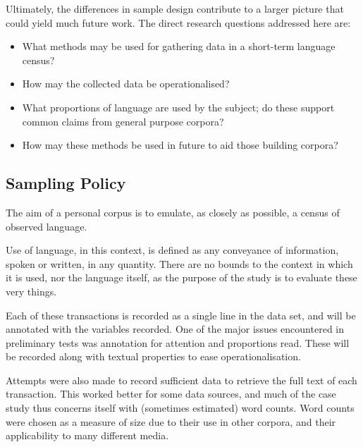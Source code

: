 Ultimately, the differences in sample design contribute to a larger picture that could yield much future work.  The direct research questions addressed here are:

\begin{itemize}
    \item What methods may be used for gathering data in a short-term language census?
    \item How may the collected data be operationalised?
    \item What proportions of language are used by the subject; do these support common claims from general purpose corpora?
    \item How may these methods be used in future to aid those building corpora?
\end{itemize}







\subsection{Sampling Policy}
\label{sec:personal:samplingpolicy}
The aim of a personal corpus is to emulate, as closely as possible, a census of observed language.

Use of language, in this context, is defined as any conveyance of information, spoken or written, in any quantity. There are no bounds to the context in which it is used, nor the language itself, as the purpose of the study is to evaluate these very things.

Each of these transactions is recorded as a single line in the data set, and will be annotated with the variables recorded.  One of the major issues encountered in preliminary tests was annotation for attention and proportions read.  These will be recorded along with textual properties to ease operationalisation.

Attempts were also made to record sufficient data to retrieve the full text of each transaction.  This worked better for some data sources, and much of the case study thus concerns itself with (sometimes estimated) word counts.  Word counts were chosen as a measure of size due to their use in other corpora, and their applicability to many different media.


